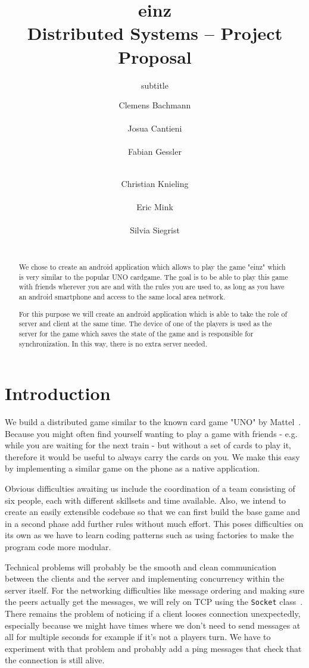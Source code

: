 \documentclass{sig-alternate}
\title{einz\\
\normalsize{Distributed Systems -- Project Proposal}}
\subtitle{subtitle}
\author{
\alignauthor
\normalsize{Clemens Bachmann}\\
	\affaddr{\normalsize{13-932-488}}\\
	\email{\normalsize{baclemen@student.ethz.ch}}
%
\alignauthor
\normalsize{Josua Cantieni}\\
	\affaddr{\normalsize{15-919-038}}\\
	\email{\normalsize{josuac@student.ethz.ch}}
%
\alignauthor
\normalsize{Fabian Gessler}\\
	\affaddr{\normalsize{15-939-341}}\\
	\email{\normalsize{fgessler@student.ethz.ch}}
\and
\alignauthor
\normalsize{Christian Knieling}\\
	\affaddr{\normalsize{ 14-923-809}}\\
	\email{\normalsize{knielinc@student.ethz.ch}}
%
\alignauthor
\normalsize{Eric Mink}\\
	\affaddr{\normalsize{15-917-057}}\\
	\email{\normalsize{minker@student.ethz.ch}}
%
\alignauthor
\normalsize{Silvia Siegrist}\\
	\affaddr{\normalsize{15-935-893}}\\
	\email{\normalsize{sisilvia@student.ethz.ch}}
}
\begin{document}
\maketitle

\begin{abstract}
We chose to create an android application which allows to play the game "einz" which is very similar to the popular UNO cardgame. The goal is to be able to play this game with friends wherever you are and with the rules you are used to, as long as you have an android smartphone and access to the same local area network.

For this purpose we will create an android application which is able to take the role of server and client at the same time. The device of one of the players is used as the server for the game which saves the state of the game and is responsible for synchronization. In this way, there is no extra server needed.
\end{abstract}

\section{Introduction}
We build a distributed game similar to the known card game "UNO" by Mattel~\cite{unoshop}. Because you might often find yourself wanting to play a game with friends - e.g. while you are waiting for the next train - but without a set of cards to play it, therefore it would be useful to always carry the cards on you. We make this easy by implementing a similar game on the phone as a native application.

Obvious difficulties awaiting us include the coordination of a team consisting of six people, each with different skillsets and time available.
Also, we intend to create an easily extensible codebase so that we can first build the base game and in a second phase add further rules without much effort. This poses difficulties on its own as we have to learn coding patterns such as using factories to make the program code more modular.

Technical problems will probably be the smooth and clean communication between the clients and the server and implementing concurrency within the server itself. For the networking difficulties like message ordering and making sure the peers actually get the messages, we will rely on TCP using the \verb|Socket| class~\cite{socketdoc}. There remains the problem of noticing if a client looses connection unexpectedly, especially because we might have times where we don't need to send messages at all for multiple seconds for example if it's not a players turn. We have to experiment with that problem and probably add a ping messages that check that the connection is still alive.
\end{document}
